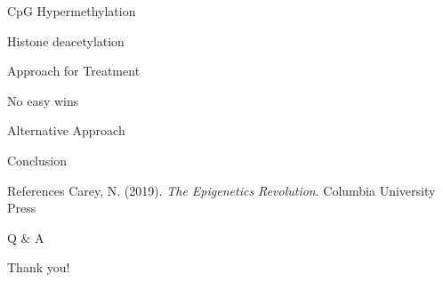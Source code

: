\documentclass{beamer}
\begin{document}
    \begin{frame}{CpG Hypermethylation}

    \end{frame}

    \begin{frame}{Histone deacetylation}

    \end{frame}

    \begin{frame}{Approach for Treatment}

    \end{frame}

    \begin{frame}{No easy wins}

    \end{frame}

    \begin{frame}{Alternative Approach}

    \end{frame}

    \begin{frame}{Conclusion}

    \end{frame}

    \begin{frame}{References}
        \footnotesize Carey, N. (2019). \textit{The Epigenetics Revolution}. Columbia University Press
    \end{frame}

    \begin{frame}[plain]
        \centering
        \huge Q \& A
    \end{frame}

    \begin{frame}[plain]
        \centering
        \huge Thank you!
    \end{frame}
\end{document}
